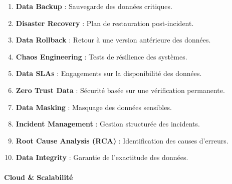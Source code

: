 \documentclass[
  letterpaper,
  DIV=11,
  numbers=noendperiod]{scrartcl}
\makeatletter
\let\oldparagraph\paragraph
\renewcommand{\paragraph}{
    \@ifstar
      \xxxParagraphStar
      \xxxParagraphNoStar
  }
\newcommand{\xxxParagraphStar}[1]{\oldparagraph*{#1}\mbox{}}
\newcommand{\xxxParagraphNoStar}[1]{\oldparagraph{#1}\mbox{}}
\providecommand{\tightlist}{%
  \setlength{\itemsep}{0pt}\setlength{\parskip}{0pt}}\usepackage{longtable,booktabs,array}
\makeatother
\begin{document}
\begin{enumerate}
\def\labelenumi{\arabic{enumi}.}
\setcounter{enumi}{60}
\tightlist
\item
  \textbf{Data Backup} : Sauvegarde des données critiques.\\
\item
  \textbf{Disaster Recovery} : Plan de restauration post-incident.\\
\item
  \textbf{Data Rollback} : Retour à une version antérieure des
  données.\\
\item
  \textbf{Chaos Engineering} : Tests de résilience des systèmes.\\
\item
  \textbf{Data SLAs} : Engagements sur la disponibilité des données.\\
\item
  \textbf{Zero Trust Data} : Sécurité basée sur une vérification
  permanente.\\
\item
  \textbf{Data Masking} : Masquage des données sensibles.\\
\item
  \textbf{Incident Management} : Gestion structurée des incidents.\\
\item
  \textbf{Root Cause Analysis (RCA)} : Identification des causes
  d'erreurs.\\
\item
  \textbf{Data Integrity} : Garantie de l'exactitude des données.
\end{enumerate}

\paragraph{\texorpdfstring{\textbf{Cloud \&
Scalabilité}}{Cloud \& Scalabilité}}\label{cloud-scalabilituxe9-1}
\end{document}
